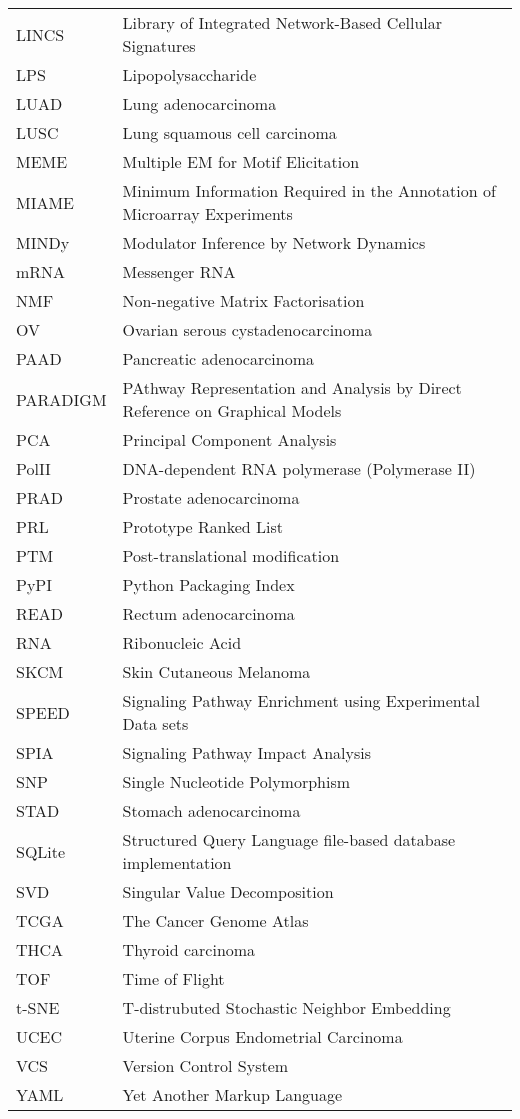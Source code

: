 \begin{longtable}{L{3cm}L{7cm}}
LINCS & Library of Integrated Network-Based Cellular Signatures \\
LPS & Lipopolysaccharide \\
LUAD & Lung adenocarcinoma \\
LUSC & Lung squamous cell carcinoma \\
MEME & Multiple EM for Motif Elicitation \\
MIAME & Minimum Information Required in the Annotation of Microarray Experiments \\
MINDy & Modulator Inference by Network Dynamics \\
mRNA & Messenger RNA \\
NMF & Non-negative Matrix Factorisation \\
OV & Ovarian serous cystadenocarcinoma \\
PAAD & Pancreatic adenocarcinoma \\
PARADIGM & PAthway Representation and Analysis by Direct Reference on Graphical Models \\
PCA & Principal Component Analysis \\
PolII & DNA-dependent RNA polymerase (Polymerase II) \\
PRAD & Prostate adenocarcinoma \\
PRL & Prototype Ranked List \\
PTM & Post-translational modification \\
PyPI & Python Packaging Index \\
READ & Rectum adenocarcinoma \\
RNA & Ribonucleic Acid \\
SKCM & Skin Cutaneous Melanoma \\
SPEED & Signaling Pathway Enrichment using Experimental Data sets \\
SPIA & Signaling Pathway Impact Analysis \\
SNP & Single Nucleotide Polymorphism \\
STAD & Stomach adenocarcinoma \\
SQLite & Structured Query Language file-based database implementation \\
SVD & Singular Value Decomposition \\
TCGA & The Cancer Genome Atlas \\
THCA & Thyroid carcinoma \\
TOF & Time of Flight \\
t-SNE & T-distrubuted Stochastic Neighbor Embedding \\
UCEC & Uterine Corpus Endometrial Carcinoma \\
VCS & Version Control System \\
YAML & Yet Another Markup Language \\
\end{longtable}
